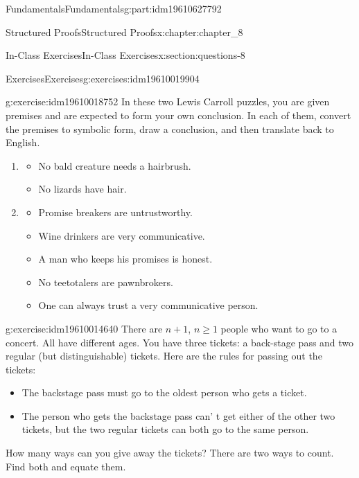 \documentclass[oneside,10pt,]{book}
\numberwithin{equation}{section}
\begin{document}
\begin{partptx}{Fundamentals}{}{Fundamentals}{}{}{g:part:idm19610627792}
\begin{chapterptx}{Structured Proofs}{}{Structured Proofs}{}{}{x:chapter:chapter_8}
\begin{sectionptx}{In-Class Exercises}{}{In-Class Exercises}{}{}{x:section:questions-8}
\begin{exercises-subsection-numberless}{Exercises}{}{Exercises}{}{}{g:exercises:idm19610019904}
\begin{exercisegroup}
\begin{divisionexerciseeg}{2}{}{}{g:exercise:idm19610018752}
In these two Lewis Carroll puzzles, you are given premises and are expected to form your own conclusion.  In each of them, convert the premises to symbolic form, draw a conclusion, and then translate back to English.%
\begin{enumerate}[label=(\alph*)]
\item{}%
\begin{itemize}[label=\textbullet]
\item{}No bald creature needs a hairbrush.%
\item{}No lizards have hair.%
\end{itemize}
%
\item{}%
\begin{itemize}[label=\textbullet]
\item{}Promise breakers are untrustworthy.%
\item{}Wine drinkers are very communicative.%
\item{}A man who keeps his promises is honest.%
\item{}No teetotalers are pawnbrokers.%
\item{}One can always trust a very communicative person.%
\end{itemize}
%
\end{enumerate}
%
\end{divisionexerciseeg}%
\begin{divisionexerciseeg}{3}{}{}{g:exercise:idm19610014640}%
There are \(n+1\), \(n\ge 1\) people who want to go to a concert.  All have different ages. You have three tickets: a back-stage pass and two regular (but distinguishable) tickets. Here are the rules for passing out the tickets:%
\begin{itemize}[label=\textbullet]
\item{}The backstage pass must go to the oldest person who gets a ticket.%
\item{}The person who gets the backstage pass can' t get either of the other two tickets, but the two regular tickets can both go to the same person.%
\end{itemize}
How many ways can you give away the tickets? There are two ways to count. Find both and equate them.%
\end{divisionexerciseeg}%
\end{exercisegroup}
\par\medskip\noindent
\end{exercises-subsection-numberless}
\end{sectionptx}
%
%
\typeout{************************************************}

\end{chapterptx}
\end{partptx}
\end{document}

